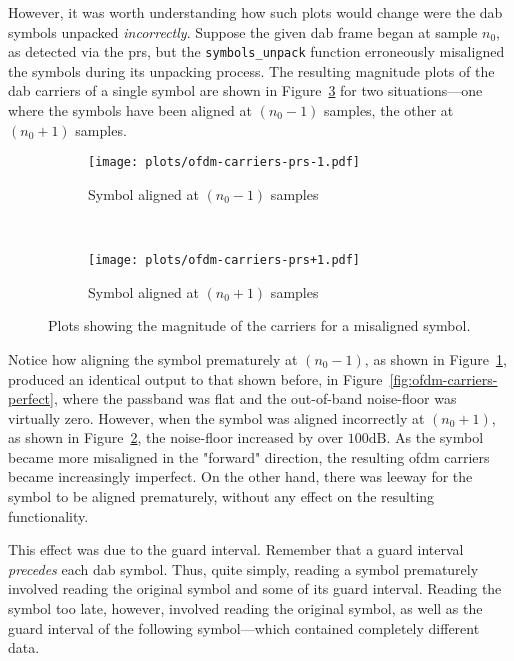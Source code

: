 \documentclass[class=report,11pt,crop=false]{standalone}
\begin{document}
However, it was worth understanding how such plots would change were the \gls{dab} symbols unpacked \emph{incorrectly}. Suppose the given \gls{dab} frame began at sample \(n_0\), as detected via the \gls{prs}, but the \texttt{symbols\_unpack} function erroneously misaligned the symbols during its unpacking process. The resulting magnitude plots of the \gls{dab} carriers of a single symbol are shown in Figure~\ref{fig:ofdm-carriers-prs} for two situations---one where the symbols have been aligned at \((n_0 - 1)\) samples, the other at \((n_0 + 1)\) samples.

\begin{figure}[htbp]
    \centering
    \captionsetup{type=figure}
    \begin{subfigure}[t]{0.45\textwidth}
      \centering
      \captionsetup{type=figure}
      \texttt{[image: plots/ofdm-carriers-prs-1.pdf]}
      \caption{Symbol aligned at \((n_0 - 1)\) samples}
      \label{fig:ofdm-carriers-prs-1}
    \end{subfigure}%
    ~ 
    \begin{subfigure}[t]{0.45\textwidth}
      \centering
      \captionsetup{type=figure}
      \texttt{[image: plots/ofdm-carriers-prs+1.pdf]}
      \caption{Symbol aligned at \((n_0 + 1)\) samples}
      \label{fig:ofdm-carriers-prs+1}
    \end{subfigure}
    \caption{Plots showing the magnitude of the  carriers for a misaligned  symbol.}
    \label{fig:ofdm-carriers-prs}
  \end{figure}

Notice how aligning the symbol prematurely at \((n_0 - 1)\), as shown in Figure~\ref{fig:ofdm-carriers-prs-1}, produced an identical output to that shown before, in Figure~\ref{fig:ofdm-carriers-perfect}, where the passband was flat and the out-of-band noise-floor was virtually zero. However, when the symbol was aligned incorrectly at \((n_0 + 1)\), as shown in Figure~\ref{fig:ofdm-carriers-prs+1}, the noise-floor increased by over \(100\si{\deci\bel}\). As the symbol became more misaligned in the "forward" direction, the resulting \gls{ofdm} carriers became increasingly imperfect. On the other hand, there was leeway for the symbol to be aligned prematurely, without any effect on the resulting functionality.

This effect was due to the guard interval. Remember that a guard interval \emph{precedes} each \gls{dab} symbol. Thus, quite simply, reading a symbol prematurely involved reading the original symbol and some of its guard interval. Reading the symbol too late, however, involved reading the original symbol, as well as the guard interval of the following symbol---which contained completely different data.
\end{document}
